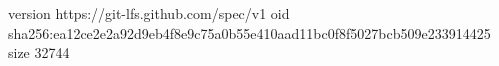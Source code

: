 version https://git-lfs.github.com/spec/v1
oid sha256:ea12ce2e2a92d9eb4f8e9c75a0b55e410aad11bc0f8f5027bcb509e233914425
size 32744
